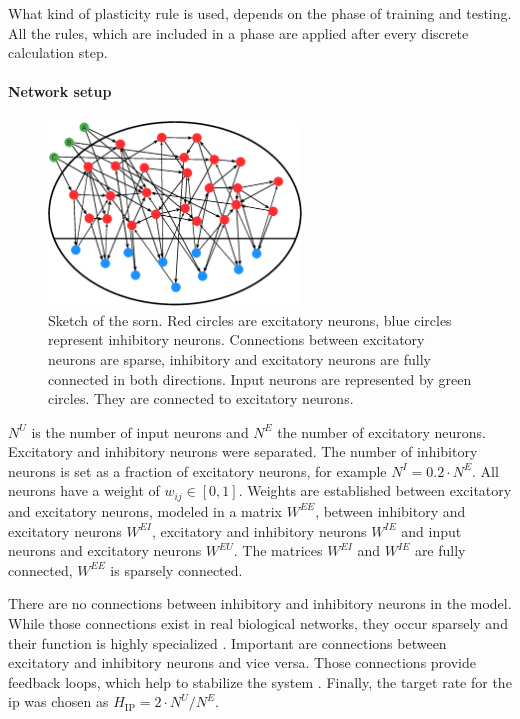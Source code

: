 What kind of plasticity rule is used, depends on the phase of training and testing. All the rules, which are included in a phase are applied after every discrete calculation step.

\paragraph{Network setup}



\begin{figure}[t]
	\centering
	\includegraphics[width=0.6\textwidth]{sorn_markov/sorn}
	\caption[Sketch of the \acl{sorn}]{Sketch of the \acl{sorn}. Red circles are excitatory neurons, blue circles represent inhibitory neurons. Connections between excitatory neurons are sparse, inhibitory and excitatory neurons are fully connected in both directions. Input neurons are represented by green circles. They are connected to excitatory neurons.}
	\label{fig:sorn}
\end{figure}

$N^U$ is the number of input neurons and $N^E$ the number of excitatory neurons. Excitatory and inhibitory neurons were separated. The number of inhibitory neurons is set as a fraction of excitatory neurons, for example $N^I = 0.2 \cdot N^E$. All neurons have a weight of $w_{ij} \in [0,1]$. Weights are established between excitatory and excitatory neurons, modeled in a matrix $W^{EE}$, between inhibitory and excitatory neurons $W^{EI}$, excitatory and inhibitory neurons $W^{IE}$ and input neurons and excitatory neurons $W^{EU}$. The matrices $W^{EI}$ and $W^{IE}$ are fully connected, $W^{EE}$ is sparsely connected.

There are no connections between inhibitory and inhibitory neurons in the model. While those connections exist in real biological networks, they occur sparsely and their function is highly specialized \parencite{chamberland2012inhibitory}. Important are connections between excitatory and inhibitory neurons and vice versa. Those connections provide feedback loops, which help to stabilize the system \parencite{turrigiano2004homeostatic}. Finally, the target rate for the \ac{ip} was chosen as $H_{\text{IP}} = 2 \cdot N^U/N^E$.

